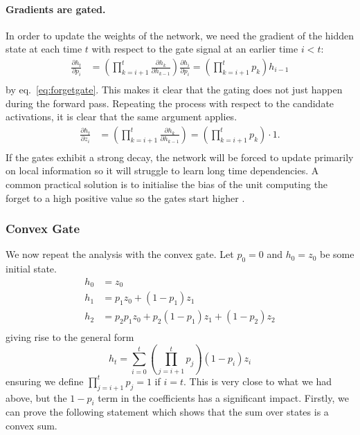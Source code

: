 \paragraph{Gradients are gated.}
In order to update the weights of the network, we need the gradient of the hidden
state at each time \(t\) with respect to the gate signal at an earlier time \(i < t\):
\begin{align}
	\frac{\partial h_t}{\partial p_i} &= 
		\left(\prod_{k=i+1}^t \frac{\partial h_k}{\partial h_{k-1}}\right) 
			\frac{\partial h_i}{\partial p_i} = 
		\left(\prod_{k=i+1}^t p_k\right)
			h_{i-1} \\
\end{align} by eq.~\ref{eq:forgetgate}.
This makes it clear that the gating does not just happen during the forward pass. 
Repeating the process with respect to the candidate activations, it is clear that
the same argument applies.
\begin{align}
	\frac{\partial h_t}{\partial z_i} &= 
	\left(\prod_{k=i+1}^t \frac{\partial h_k}{\partial h_{k-1}}\right) 
	= \left(\prod_{k=i+1}^t p_k\right) \cdot
			1. \\
\end{align} If the gates
exhibit a strong decay, the network will be forced to update primarily on
local information so it will struggle to learn long time dependencies.
A common practical solution is to initialise the bias of the unit computing the forget to a high
positive value so the gates start higher \autocite{Jozefowicz2015}.

\subsubsection{Convex Gate}
We now repeat the analysis with the convex gate. Let \(p_0 = 0\) and \(h_0 = z_0\) be some initial
state.
\begin{align}
	h_0 &= z_0 \\
    h_1 &= p_1z_0 + (1-p_1)z_1 \\
    h_2 &= p_2p_1z_0 + p_2(1-p_1)z_1 + (1-p_2)z_2 \\
\end{align} giving rise to the general form
\begin{equation}
	h_t = \sum_{i=0}^t \left(\prod_{j=i+1}^t p_j\right) (1 - p_i) z_i
\end{equation} ensuring we define \(\prod_{j=i+1}^tp_j = 1\) if \(i = t\).
This is very close to what we had above, but the \(1-p_i\) term in the
coefficients has a significant impact. Firstly, we can prove the following statement which shows
that the sum over states is a convex sum.

